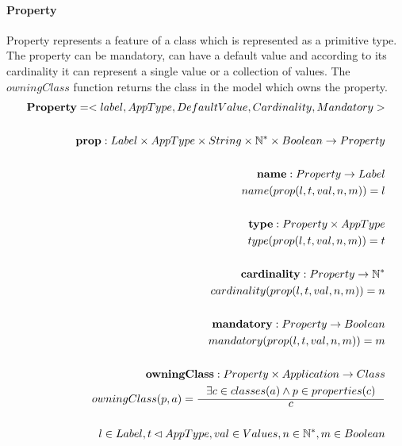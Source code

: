 \documentclass[11pt]{article}
\begin{document}
\paragraph{Property} Property represents a feature of a class which is represented as a primitive type. The property can be mandatory, can have a default value and according to its cardinality it can represent a single value or a collection of values. The $owningClass$ function returns the class in the model which owns the property.
\begin{align*}
	\mathbf{Property} = <label, AppType, DefaultValue, Cardinality, Mandatory> \\ \\
	\mathbf{prop} : Label \times AppType \times String \times \mathbb{N^{*}} \times Boolean \rightarrow Property \\ \\
	\mathbf{name} : Property \rightarrow Label \\
	name(prop(l, t, val, n, m)) = l \\ \\
	\mathbf{type} : Property \times AppType \\
	type(prop(l, t, val, n, m)) = t \\ \\
	\mathbf{cardinality} : Property \rightarrow \mathbb{N^{*}} \\
	cardinality(prop(l, t, val, n, m)) = n \\ \\
	\mathbf{mandatory} : Property \rightarrow Boolean \\
	mandatory(prop(l, t, val, n, m)) = m  \\ \\
	\mathbf{owningClass} : Property \times Application \rightarrow Class  \\ 	
	owningClass(p, a) = \inference{\exists c \in classes(a) \wedge p \in properties(c)}{c}  \\ \\
	l \in Label, t \lhd AppType, val \in Values, n \in \mathbb{N^{*}}, m \in Boolean 
\end{align*}
\end{document}
